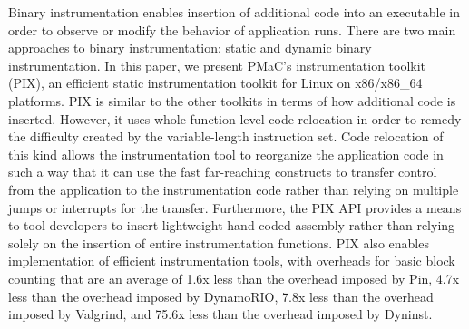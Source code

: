 \begin{it}

Binary instrumentation enables insertion of additional code into an
executable in order to observe or modify the behavior of application runs. 
There are two main approaches to binary instrumentation: static and dynamic
binary instrumentation. In this paper, we present PMaC's instrumentation toolkit (PIX), 
an efficient static  instrumentation toolkit for Linux on x86/x86\_64 platforms. PIX
is similar to the other toolkits in terms of how additional code is inserted. However, it uses whole function level
code relocation in order to remedy the difficulty created by the variable-length instruction set. Code relocation of this kind allows the
instrumentation tool to reorganize the application code in such a way that it
can use the fast  far-reaching constructs to transfer control
from the application to the instrumentation code rather than relying on multiple
jumps or interrupts for the transfer. Furthermore, the PIX API provides a means to
tool developers to insert lightweight hand-coded assembly
rather than relying solely on the insertion of entire instrumentation functions.
PIX also enables implementation of efficient instrumentation tools, 
with overheads for basic block counting that are an
average of 1.6x less than the overhead imposed by Pin, 4.7x less than the overhead imposed by
DynamoRIO, 7.8x less than the overhead imposed by Valgrind, and 75.6x less than the overhead imposed by Dyninst.

\end{it}
